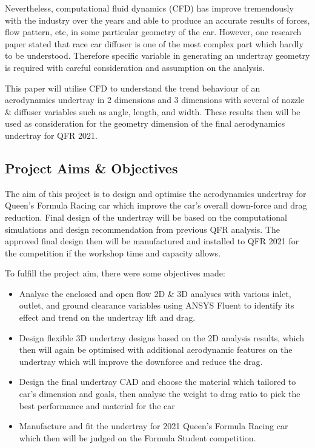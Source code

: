 \noindent Nevertheless, computational fluid dynamics (CFD) has improve tremendously with the industry over the years and able to produce an accurate results of forces, flow pattern, etc, in some particular geometry of the car. However, one research paper \cite{Zhang2006GroundCars} stated that race car diffuser is one of the most complex part which hardly to be understood. Therefore specific variable in generating an undertray geometry is required with careful consideration and assumption on the analysis. 

\noindent This paper will utilise CFD to understand the trend behaviour of an aerodynamics undertray in 2 dimensions and 3 dimensions with several of nozzle \& diffuser variables such as angle, length, and width. These results then will be used as consideration for the geometry dimension of the final aerodynamics undertray for QFR 2021.

\subsection{Project Aims \& Objectives}
The aim of this project is to design and optimise the aerodynamics undertray for Queen's Formula Racing car which improve the car's overall down-force and drag reduction. Final design of the undertray will be based on the computational simulations and design recommendation from previous QFR analysis. The approved final design then will be manufactured and installed to QFR 2021 for the competition if the workshop time and capacity allows.

\noindent
To fulfill the project aim, there were some objectives made:
\begin{itemize}
    \item Analyse the enclosed and open flow 2D \& 3D analyses with various inlet, outlet, and ground clearance variables  using ANSYS Fluent to identify its effect and trend on the undertray lift and drag. 
    \item Design flexible 3D undertray designs based on the 2D analysis results, which then will again be optimised with additional aerodynamic features on the undertray which will improve the downforce and reduce the drag.
	\item Design the final undertray CAD and choose the material which tailored to car’s dimension and goals, then analyse the weight to drag ratio to pick the best performance and material for the car
    \item Manufacture and fit the undertray for 2021 Queen’s Formula Racing car which then will be judged on the Formula Student competition.
\end{itemize}